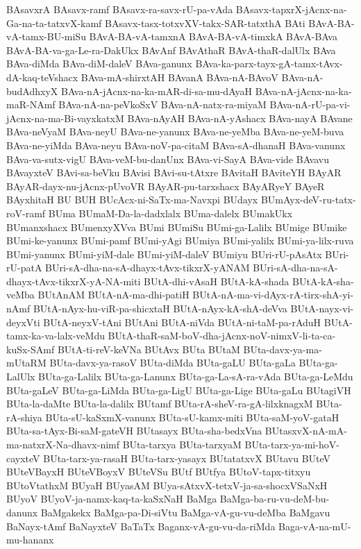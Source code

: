 {BAsavxrA
BAsavx-ramf
BAsavx-ra-savx-rU-pa-vAda
BAsavx-tapxrX-jAcnx-na-Ga-na-ta-tatxvX-kamf
BAsavx-tasx-totxvXV-takx-SAR-tatxthA
BAti
BAvA-BA-vA-tamx-BU-miSu
BAvA-BA-vA-tamxnA
BAvA-BA-vA-timxkA
BAvA-BAva
BAvA-BA-va-ga-Le-ra-DakUkx
BAvAnf
BAvAthaR
BAvA-thaR-dalUlx
BAva
BAva-diMda
BAva-diM-daleV
BAva-ganunx
BAva-ka-parx-tayx-gA-tamx-tAvx-dA-kaq-teVshacx
BAva-mA-shirxtAH
BAvanA
BAva-nA-BAvoV
BAva-nA-budAdhxyX
BAva-nA-jAcnx-na-ka-mAR-di-sa-mu-dAyaH
BAva-nA-jAcnx-na-ka-maR-NAmf
BAva-nA-na-peVkoSxV
BAva-nA-natx-ra-miyaM
BAva-nA-rU-pa-vi-jAcnx-na-ma-Bi-vayxkatxM
BAva-nAyAH
BAva-nA-yAshacx
BAva-nayA
BAvane
BAva-neVyaM
BAva-neyU
BAva-ne-yanunx
BAva-ne-yeMba
BAva-ne-yeM-buva
BAva-ne-yiMda
BAva-neyu
BAva-noV-pa-citaM
BAva-sA-dhanaH
BAva-vanunx
BAva-va-sutx-vigU
BAva-veM-bu-danUnx
BAva-vi-SayA
BAva-vide
BAvavu
BAvayxteV
BAvi-sa-beVku
BAvisi
BAvi-su-tAtxre
BAvitaH
BAviteYH
BAyAR
BAyAR-dayx-nu-jAcnx-pUvoVR
BAyAR-pu-tarxshacx
BAyARyeY
BAyeR
BAyxhitaH
BU
BUH
BUcAcx-ni-SaTx-ma-Navxpi
BUdayx
BUmAyx-deV-ru-tatx-roV-ramf
BUma
BUmaM-Da-la-dadxlalx
BUma-dalelx
BUmakUkx
BUmanxshacx
BUmenxyXVva
BUmi
BUmiSu
BUmi-ga-Lalilx
BUmige
BUmike
BUmi-ke-yanunx
BUmi-pamf
BUmi-yAgi
BUmiya
BUmi-yalilx
BUmi-ya-lilx-ruva
BUmi-yanunx
BUmi-yiM-dale
BUmi-yiM-daleV
BUmiyu
BUri-rU-pAsAtx
BUri-rU-patA
BUri-sA-dha-na-sA-dhayx-tAvx-tikxrX-yANAM
BUri-sA-dha-na-sA-dhayx-tAvx-tikxrX-yA-NA-miti
BUtA-dhi-vAsaH
BUtA-kA-shada
BUtA-kA-sha-veMba
BUtAnAM
BUtA-nA-ma-dhi-patiH
BUtA-nA-ma-vi-dAyx-rA-tirx-shA-yi-nAmf
BUtA-nAyx-hu-viR-pa-shicxtaH
BUtA-nAyx-kA-shA-deVva
BUtA-nayx-vi-deyxVti
BUtA-neyxV-tAni
BUtAni
BUtA-niVda
BUtA-ni-taM-pa-rAduH
BUtA-tamx-ka-va-lalx-veMdu
BUtA-thaR-saM-boV-dha-jAcnx-noV-nimxV-li-ta-ca-kuSx-SAmf
BUtA-ti-reV-keVNa
BUtAvx
BUta
BUtaM
BUta-davx-ya-ma-mUtaRM
BUta-davx-ya-rasoV
BUta-diMda
BUta-gaLU
BUta-gaLa
BUta-ga-LalUlx
BUta-ga-Lalilx
BUta-ga-Lanunx
BUta-ga-La-sA-ra-vAda
BUta-ga-LeMdu
BUta-gaLeV
BUta-ga-LiMda
BUta-ga-LigU
BUta-ga-Lige
BUta-gaLu
BUtagiVH
BUta-la-daMte
BUta-la-dalilx
BUtamf
BUta-rA-sheV-ra-gA-lilxknagxM
BUta-rA-shiya
BUta-sU-kaSxmX-vanunx
BUta-sU-kamx-miti
BUta-saM-yoV-gataH
BUta-sa-tAyx-Bi-saM-gateVH
BUtasayx
BUta-sha-bedxVna
BUtasxvX-nA-mA-ma-natxrX-Na-dhavx-nimf
BUta-tarxya
BUta-tarxyaM
BUta-tarx-ya-mi-hoV-cayxteV
BUta-tarx-ya-rasaH
BUta-tarx-yasayx
BUtatatxvX
BUtavu
BUteV
BUteVBayxH
BUteVBoyxV
BUteVSu
BUtf
BUtfya
BUtoV-tapx-titxyu
BUtoVtathxM
BUyaH
BUyasAM
BUya-sAtxvX-tetxV-ja-sa-shocxVSaNxH
BUyoV
BUyoV-ja-namx-kaq-ta-kaSxNaH
BaMga
BaMga-ba-ru-vu-deM-bu-danunx
BaMgakekx
BaMga-pa-Di-siVtu
BaMga-vA-gu-vu-deMba
BaMgavu
BaNayx-tAmf
BaNayxteV
BaTaTx
Baganx-vA-gu-vu-da-riMda
Baga-vA-na-mU-mu-hananx
}
